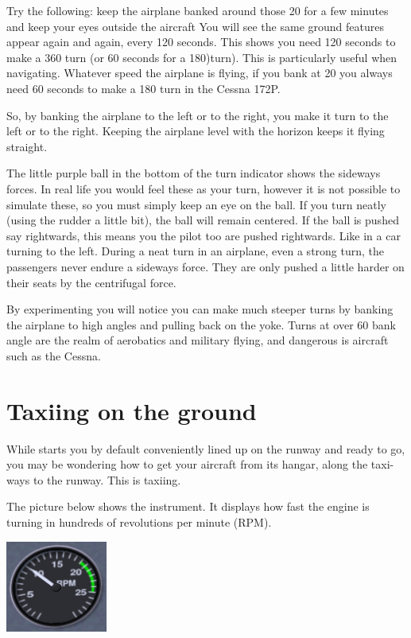 \begin{itemize}
Try the following: keep the airplane banked around those 20\textdegree{} for a
few minutes and keep your eyes outside the aircraft You will see the same
ground features appear again and again, every 120 seconds. This shows you
need 120 seconds to make a 360\textdegree{} turn (or 60 seconds for a
180\textdegree{})turn). This is particularly useful when navigating.
Whatever speed the airplane is flying, if you bank at 20\textdegree{} you
always need 60 seconds to make a 180\textdegree{} turn in the Cessna 172P.

So, by banking the airplane to the left or to the right, you make it turn to
the left or to the right. Keeping the airplane level with the horizon keeps
it flying straight.

The little purple ball in the bottom of the turn indicator
shows the sideways forces. In real life you would feel these as your turn,
however it is not possible to simulate these, so you must simply keep an eye
on the ball. If you turn neatly (using the rudder a little bit),
the ball will remain centered. If the ball is pushed say rightwards, this
means you the pilot too are pushed rightwards. Like in a car turning to the
left. During a neat turn in an airplane, even a strong turn, the passengers
never endure a sideways force. They are only pushed a little harder on their
seats by the centrifugal force.

By experimenting you will notice you can make much steeper turns by
banking the airplane to high angles and pulling back on the yoke. Turns at over
60\textdegree{} bank angle are the realm of aerobatics and military flying, and
dangerous is aircraft such as the Cessna.

\section{Taxiing on the ground}
\label{sec:TaxiTurning}

While \FlightGear{} starts you by default conveniently lined up on the
runway and ready to go, you may be wondering how to get your aircraft from
its hangar, along the taxi-ways to the runway. This is taxiing.

The picture below shows the  instrument. It displays how fast
the engine is turning in hundreds of revolutions per minute (RPM).

\begin{center}
\includegraphics[width=0.25\textwidth]{img/tut_20}
\end{center}


\end{itemize}
